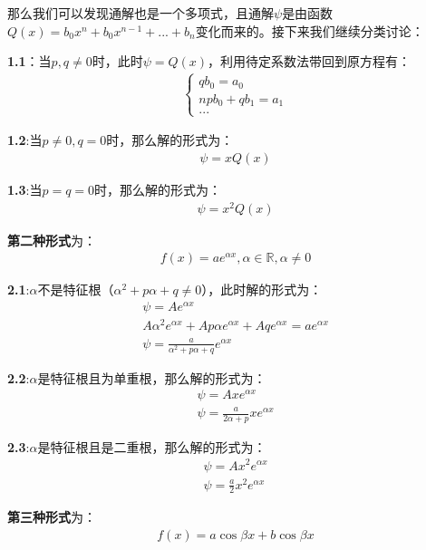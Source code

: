\documentclass{ctexart}
\let\oldtextbf\textbf
\renewcommand{\textbf}[1]{\textcolor{brown!50!red}{\oldtextbf{#1}}}
\begin{document}
那么我们可以发现通解也是一个多项式，且通解$\psi$是由函数$Q(x)=b_0x^n+b_0x^{n-1}+...+b_n$变化而来的。接下来我们继续分类讨论：

\textbf{\color{brown!50!red}1.1}：当$p,q\neq0$时，此时$\psi=Q(x)$，利用待定系数法带回到原方程有：
\begin{align*}
\begin{cases}
qb_0=a_0\\
npb_0+qb_1=a_1\\
...
\end{cases} \tag{4-14}
\end{align*}

\textbf{\color{brown!50!red}1.2}:当$p\neq0,q=0$时，那么解的形式为：
\begin{align*}
    \psi=xQ(x)\tag{4-15}
\end{align*}

\textbf{\color{brown!50!red}1.3}:当$p=q=0$时，那么解的形式为：
\begin{align*}
    \psi=x^2Q(x)\tag{4-16}
\end{align*}

\textbf{\color{brown!50!red}第二种形式}为：
\begin{align*}
    f(x)=ae^{\alpha x},\alpha\in\mathbb{R},\alpha\neq0
\end{align*}

\textbf{\color{brown!50!red}2.1}:$\alpha$不是特征根（$\alpha^2+p\alpha+q\neq0$），此时解的形式为：
\begin{gather*}
\psi=Ae^{\alpha x}\tag{4-17}\\
A\alpha^2e^{\alpha x}+Ap\alpha e^{\alpha x}+Aqe^{\alpha x}=ae^{\alpha x}\\
\psi=\frac{a}{\alpha^2+p\alpha+q}e^{\alpha x} 
\end{gather*}

\textbf{\color{brown!50!red}2.2}:$\alpha$是特征根且为单重根，那么解的形式为：
\begin{gather*}
\psi=Axe^{\alpha x}\tag{4-18}\\
\psi=\frac{a}{2\alpha+p}xe^{\alpha x} 
\end{gather*}

\textbf{\color{brown!50!red}2.3}:$\alpha$是特征根且是二重根，那么解的形式为：
\begin{gather*}
\psi=Ax^2e^{\alpha x}\tag{4-19}\\
\psi=\frac{a}{2}x^2e^{\alpha x} 
\end{gather*}

\textbf{\color{brown!50!red}第三种形式}为：
\begin{align*}
    f(x)=a\cos\beta x+b\cos\beta x
\end{align*}
\end{document}
